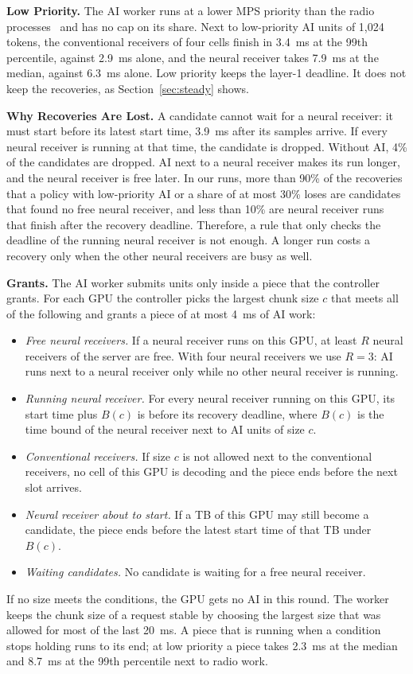 \documentclass[acmsmall,screen,review,anonymous]{acmart}
\begin{document}
\noindent\textbf{Low Priority.} The AI worker runs at a lower MPS priority than the radio
processes~\cite{nvidiampS} and has no cap on its share. Next to low-priority AI units of 1,024 tokens, the
conventional receivers of four cells finish in 3.4~ms at the 99th percentile, against 2.9~ms alone, and the
neural receiver takes 7.9~ms at the median, against 6.3~ms alone. Low priority keeps the layer-1 deadline.
It does not keep the recoveries, as Section~\ref{sec:steady} shows.

\noindent\textbf{Why Recoveries Are Lost.} A candidate cannot wait for a neural receiver: it must start
before its latest start time, 3.9~ms after its samples arrive. If every neural receiver is running at that
time, the candidate is dropped. Without AI, 4\% of the candidates are dropped. AI next to a neural receiver
makes its run longer, and the neural receiver is free later. In our runs, more than 90\% of the recoveries
that a policy with low-priority AI or a share of at most 30\% loses are candidates that found no free neural
receiver, and less than 10\% are neural receiver runs that finish after the recovery deadline. Therefore, a
rule that only checks the deadline of the running neural receiver is not enough. A longer run costs a
recovery only when the other neural receivers are busy as well.

\noindent\textbf{Grants.} The AI worker submits units only inside a piece that the controller grants. For
each GPU the controller picks the largest chunk size $c$ that meets all of the following and grants a piece
of at most 4~ms of AI work:
\begin{itemize}
\item \emph{Free neural receivers.} If a neural receiver runs on this GPU, at least $R$ neural receivers of
the server are free. With four neural receivers we use $R=3$: AI runs next to a neural receiver only while
no other neural receiver is running.
\item \emph{Running neural receiver.} For every neural receiver running on this GPU, its start time plus
$B(c)$ is before its recovery deadline, where $B(c)$ is the time bound of the neural receiver next to AI
units of size $c$.
\item \emph{Conventional receivers.} If size $c$ is not allowed next to the conventional receivers, no cell
of this GPU is decoding and the piece ends before the next slot arrives.
\item \emph{Neural receiver about to start.} If a TB of this GPU may still become a candidate, the piece
ends before the latest start time of that TB under $B(c)$.
\item \emph{Waiting candidates.} No candidate is waiting for a free neural receiver.
\end{itemize}
If no size meets the conditions, the GPU gets no AI in this round. The worker keeps the chunk size of a
request stable by choosing the largest size that was allowed for most of the last 20~ms. A piece that is
running when a condition stops holding runs to its end; at low priority a piece takes 2.3~ms at the median
and 8.7~ms at the 99th percentile next to radio work.
\end{document}
